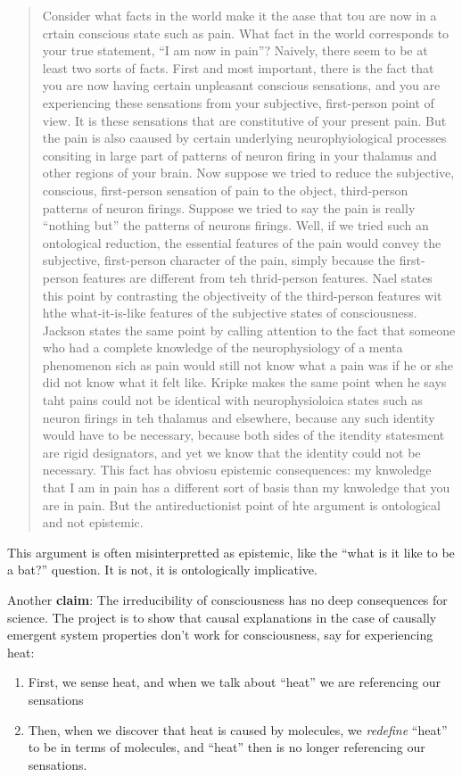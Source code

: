 \documentclass{article}
\newcommand{\ti}[1]{\textit{#1}}
\newcommand{\tb}[1]{\textbf{#1}}
\begin{document}
\begin{quote}
Consider what facts in the world make it the aase that tou are now in a crtain conscious state such as pain. What fact in the world corresponds to your true statement, ``I am now in pain''? Naively, there seem to be at least two sorts of facts. First and most important, there is the fact that you are now having certain unpleasant conscious sensations, and you are experiencing these sensations from your subjective, first-person point of view. It is these sensations that are constitutive of your present pain. But the pain is also caaused by certain underlying neurophyiological processes consiting in large part of patterns of neuron firing in your thalamus and other regions of your brain. Now suppose we tried to reduce the subjective, conscious, first-person sensation of pain to the object, third-person patterns of neuron firings. Suppose we tried to say the pain is really ``nothing but'' the patterns of neurons firings. Well, if we tried such an ontological reduction, the essential features of the pain would convey the subjective, first-person character of the pain, simply because the first-person features are different from teh thrid-person features. Nael states this point by contrasting the objectiveity of the third-person features wit hthe what-it-is-like features of the subjective states of consciousness. Jackson states the same point by calling attention to the fact that someone who had a complete knowledge of the neurophysiology of a menta phenomenon sich as pain would still not know what a pain was if he or she did not know what it felt like. Kripke makes the same point when he says taht pains could not be identical with neurophysioloica states such as neuron firings in teh thalamus and elsewhere, because any such identity would have to be necessary, because both sides of the itendity statesment are rigid designators, and yet we know that the identity could not be necessary. This fact has obviosu epistemic consequences: my knwoledge that I am in pain has a different sort of basis than my knwoledge that you are in pain. But the antireductionist point of hte argument is ontological and not epistemic.
\end{quote}

This argument is often misinterpretted as epistemic, like the ``what is it like to be a bat?'' question. It is not, it is ontologically implicative.

Another \tb{claim}: The irreducibility of consciousness has no deep consequences for science. The project is to show that causal explanations in the case of causally emergent system properties don't work for consciousness, say for experiencing heat:
\begin{enumerate}
\item First, we sense heat, and when we talk about ``heat'' we are referencing our sensations
\item Then, when we discover that heat is caused by molecules, we \ti{redefine} ``heat'' to be in terms of molecules, and ``heat'' then is no longer referencing our sensations.
\end{enumerate}
\end{document}
